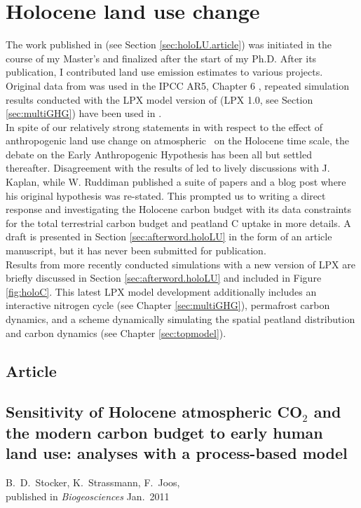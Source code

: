 \chapter{Holocene land use change}
\label{sec:holoLU}

The work published in \citet{stocker11bg} (see Section \ref{sec:holoLU.article}) was initiated in the course of my Master's and finalized after the start of my Ph.D. After its publication, I contributed land use emission estimates to various projects. Original data from \citet{stocker11bg} was used in the IPCC AR5, Chapter 6 \citep{ciais13ipcc}, repeated simulation results conducted with the LPX model version of \citet{stocker13natcc} (LPX 1.0, see Section \ref{sec:multiGHG}) have been used in \citet{lequere13essd}. \\

In spite of our relatively strong statements in \citet{stocker11bg} with respect to the effect of anthropogenic land use change on atmospheric \coo\ on the Holocene time scale, the debate on the Early Anthropogenic Hypothesis \citep{ruddiman03cc} has been all but settled thereafter. Disagreement with the results of \citet{kaplan09} led to lively discussions with J. Kaplan, while W. Ruddiman published a suite of papers \citep{ruddiman11hol, ruddiman13} and a blog post \citep{eah_realclimate} where his original hypothesis was re-stated. This prompted us to writing a direct response and investigating the Holocene carbon budget with its data constraints for the total terrestrial carbon budget \citep{elsig} and peatland C uptake \citep{yu11hol} in more details. A draft is presented in Section \ref{sec:afterword.holoLU} in the form of an article manuscript, but it has never been submitted for publication. \\

Results from more recently conducted simulations with a new version of LPX are briefly discussed in Section \ref{sec:afterword.holoLU} and included in Figure \ref{fig:holoC}. This latest LPX model development additionally includes an interactive nitrogen cycle (see Chapter \ref{sec:multiGHG}), permafrost carbon dynamics, and a scheme dynamically simulating the spatial peatland distribution and carbon dynamics (see Chapter \ref{sec:topmodel}).


\section{Article}
\section*{Sensitivity of Holocene atmospheric CO$_2$ and the modern carbon budget  to early human land use: analyses with a process-based model}
\label{sec:holoLU.article}
{B.~D.~Stocker\footnotemark[1]\footnotemark[2],
K.~Strassmann\footnotemark[1]\footnotemark[2],
F.~Joos\footnotemark[1]\footnotemark[2],
}
\bigskip\\
\noindent
{published in \emph{Biogeosciences} Jan.~2011}

